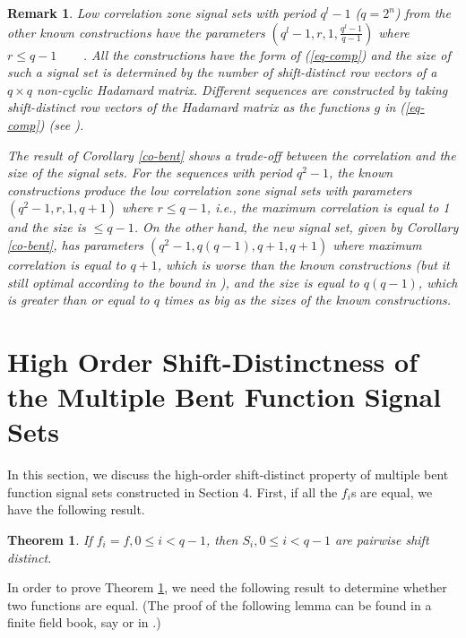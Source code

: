 \documentclass{article}
\newtheorem{theorem}{Theorem}
\newtheorem{remark}{Remark}
\begin{document}
\begin{remark}

Low correlation zone signal sets with period $q^l-1$ ($q=2^n$) from  the other known constructions  
have  the parameters  $(q^l-1, r,  1, \frac{q^l-1}{q-1})$ where $r \le q-1$   ~\cite{Tang}  ~\cite{Kim} \cite{JNCT}  
 \cite{GGS}.  All the constructions have the form of (\ref{eq-comp}) and the size of such a signal set is determined by the number of shift-distinct row vectors of a $q\times q$ non-cyclic  Hadamard matrix.  Different sequences are constructed by taking   shift-distinct  row vectors of the Hadamard matrix as the functions $g$   in (\ref{eq-comp}) (see \cite{GGS}).  
 
 The result of Corollary \ref{co-bent}  shows a trade-off between the correlation and the size of the signal sets.  For  the sequences with period $q^2-1$,  the known constructions produce the low correlation zone signal sets with parameters $(q^2-1, r, 1, q+1)$ where $r\le q-1$,  i.e., the maximum correlation  is equal to 1 and the size is $\le q-1$. On the other hand,   the new signal set, given by Corollary \ref{co-bent}, has parameters $(q^2-1, q(q-1), q+1, q+1)$   where maximum correlation is equal to $q+1$,  which is worse  than the known constructions (but it still optimal according to the bound in \cite{Tang1}),  and the size is equal to $q(q-1)$,   which is greater  than or equal to    $q$ times as big as the sizes of the known constructions. 

\end{remark}

\section{High Order Shift-Distinctness of  the Multiple Bent Function Signal Sets}

In this section, we discuss the high-order shift-distinct property of  multiple  bent function signal sets constructed in Section 4. First,  if all the $f_i$s are equal, we have  the following result. 

\begin{theorem} \label{th-sd} If  $f_i=f,  0\le i<q-1$,  then $S_i, 0\le i<q-1$ are pairwise shift distinct. \end{theorem}


In order to prove Theorem \ref{th-sd}, we need the following result to determine whether  two functions are 
equal.  (The proof of the following lemma can be found in a finite
field book, say \cite{LidlNiederreiter}\cite{McEliece} or in
\cite{Golomb-Gong}.)
\end{document}
